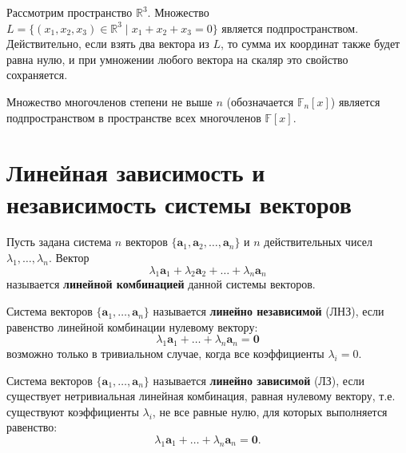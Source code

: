 \documentclass[10pt]{article}
\begin{document}
\begin{example}
Рассмотрим пространство \(\mathbb{R}^3\). Множество \(L = \{(x_1, x_2, x_3) \in \mathbb{R}^3 \mid x_1 + x_2 + x_3 = 0\}\) является подпространством. Действительно, если взять два вектора из \(L\), то сумма их координат также будет равна нулю, и при умножении любого вектора на скаляр это свойство сохраняется.
\end{example}

\begin{example}
Множество многочленов степени не выше \(n\) (обозначается \(\mathbb{F}_n[x]\)) является подпространством в пространстве всех многочленов \(\mathbb{F}[x]\).
\end{example}

\section*{Линейная зависимость и независимость системы векторов}

\begin{definition}
Пусть задана система \(n\) векторов \(\{\mathbf{a}_1, \mathbf{a}_2, \dots, \mathbf{a}_n\}\) и \(n\) действительных чисел \(\lambda_1, \dots, \lambda_n\). Вектор
\begin{equation}
\label{eq:lincomb}
\lambda_1 \mathbf{a}_1 + \lambda_2 \mathbf{a}_2 + \dots + \lambda_n \mathbf{a}_n
\end{equation}
называется \textbf{линейной комбинацией} данной системы векторов.
\end{definition}

\begin{definition}
Система векторов \(\{\mathbf{a}_1, \dots, \mathbf{a}_n\}\) называется \textbf{линейно независимой} (ЛНЗ), если равенство линейной комбинации нулевому вектору:
\[
\lambda_1 \mathbf{a}_1 + \dots + \lambda_n \mathbf{a}_n = \mathbf{0}
\]
возможно только в тривиальном случае, когда все коэффициенты \(\lambda_i = 0\).
\end{definition}

\begin{definition}
Система векторов \(\{\mathbf{a}_1, \dots, \mathbf{a}_n\}\) называется \textbf{линейно зависимой} (ЛЗ), если существует нетривиальная линейная комбинация, равная нулевому вектору, т.е. существуют коэффициенты \(\lambda_i\), не все равные нулю, для которых выполняется равенство:
\[
\lambda_1 \mathbf{a}_1 + \dots + \lambda_n \mathbf{a}_n = \mathbf{0}.
\]
\end{definition}
\end{document}

